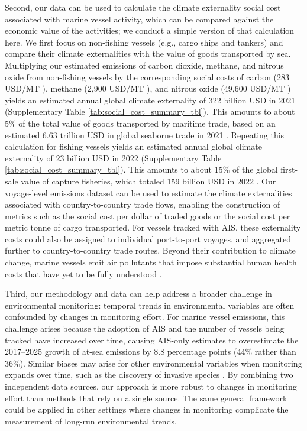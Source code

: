\documentclass[lineno,pdflatex,sn-nature]{sn-jnl}
\begin{document}
Second, our data can be used to calculate the climate externality social cost associated with marine vessel activity, which can be compared against the economic value of the activities; we conduct a simple version of that calculation here. We first focus on non-fishing vessels (e.g., cargo ships and tankers) and compare their climate externalities with the value of goods transported by sea. Multiplying our estimated emissions of carbon dioxide, methane, and nitrous oxide from non-fishing vessels by the corresponding social costs of carbon (283 USD/MT \cite{moore2024synthesis}), methane (2,900 USD/MT \cite{wang2023damage}), and nitrous oxide (49,600 USD/MT \cite{wang2023damage}) yields an estimated annual global climate externality of 322 billion USD in 2021 (Supplementary Table \ref{tab:social_cost_summary_tbl}). This amounts to about 5\% of the total value of goods transported by maritime trade, based on an estimated 6.63 trillion USD in global seaborne trade in 2021 \cite{hoffmeister2022developing}. Repeating this calculation for fishing vessels yields an estimated annual global climate externality of 23 billion USD in 2022 (Supplementary Table \ref{tab:social_cost_summary_tbl}). This amounts to about 15\% of the global first-sale value of capture fisheries, which totaled 159 billion USD in 2022 \cite{fisheries2024state}. Our voyage-level emissions dataset can be used to estimate the climate externalities associated with country-to-country trade flows, enabling the construction of metrics such as the social cost per dollar of traded goods or the social cost per metric tonne of cargo transported. For vessels tracked with AIS, these externality costs could also be assigned to individual port-to-port voyages, and aggregated further to country-to-country trade routes. Beyond their contribution to climate change, marine vessels emit air pollutants that impose substantial human health costs that have yet to be fully understood \cite{zhang2021global}.

Third, our methodology and data can help address a broader challenge in environmental monitoring: temporal trends in environmental variables are often confounded by changes in monitoring effort. For marine vessel emissions, this challenge arises because the adoption of AIS and the number of vessels being tracked have increased over time, causing AIS-only estimates to overestimate the 2017--2025 growth of at-sea emissions by 8.8 percentage points (44\% rather than 36\%). Similar biases may arise for other environmental variables when monitoring expands over time, such as the discovery of invasive species \cite{costello2003pattern}. By combining two independent data sources, our approach is more robust to changes in monitoring effort than methods that rely on a single source. The same general framework could be applied in other settings where changes in monitoring complicate the measurement of long-run environmental trends.
\end{document}
